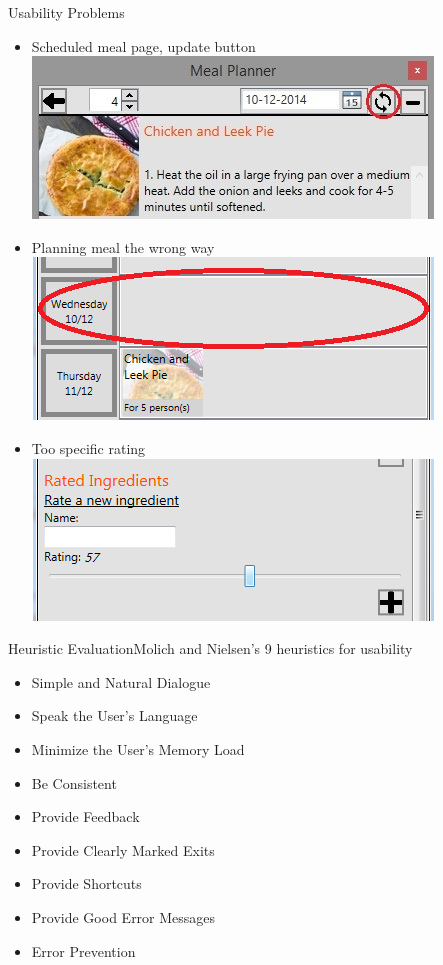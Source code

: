 \begin{frame}{Usability Problems}
    \begin{itemize}
        \item Scheduled meal page, update button
        \newline \includegraphics[scale=0.4]{./graphics/UsabilityTest_datepickerRedCircle}
        \item Planning meal the wrong way
        \newline \includegraphics[scale=0.4]{./graphics/UsabilityTest_Screenshot02}
        \item Too specific rating
        \newline \includegraphics[scale=0.4]{./graphics/UsabilityTest_Screenshot03}
    \end{itemize}
\end{frame}

\begin{frame}{Heuristic Evaluation}{Molich and Nielsen’s 9 heuristics for usability}
    \begin{itemize}
        \item Simple and Natural Dialogue
        \item Speak the User’s Language 
        \item Minimize the User’s Memory Load 
        \item Be Consistent
        \item Provide Feedback 
        \item Provide Clearly Marked Exits 
        \item Provide Shortcuts 
        \item Provide Good Error Messages
        \item Error Prevention
    \end{itemize}
\end{frame}


